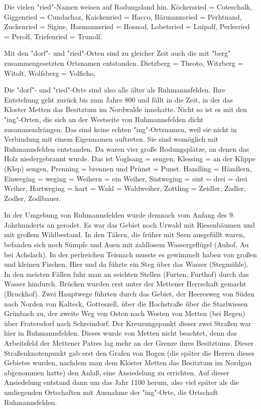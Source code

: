 \documentclass{book}
\begin{document}
Die vielen "ried"-Namen weisen auf Rodungsland hin. Köckersried = Coteschalk,
Giggenried = Cundachaz, Kaickenried = Hacco, Bärmannsried = Perhtnand,
Zuckenried = Sigine, Hasmannsried = Hosnod, Lobetsried = Luipolf, Perlesried =
Perolf, Triefenried = Trunolf.

Mit den "dorf"- und "ried"-Orten sind zu gleicher Zeit auch die mit "berg"
zusammengesetzten Ortsnamen entstanden. Dietzberg = Theoto, Witzberg = Witolt,
Wolfsberg = Volficho,

Die "dorf"- und "ried"-Orte sind also alle älter als Ruhmannsfelden. Ihre
Entstehung geht zurück bis zum Jahre 800 und fällt in die Zeit, in der das
Kloster Metten das Besitztum im Nordwalde innehatte. Nicht so ist es mit den
"ing"-Orten, die sich an der Westseite von Ruhmannsfelden dicht zusammendrängen.
Das sind keine echten "ing"-Ortsnamen, weil sie nicht in Verbindung mit einem
Eigennamen auftreten. Sie sind womöglich mit Ruhmannsfelden entstanden. Da waren
vier große Rodungsplätze, an denen das Holz niedergebrannt wurde. Das ist
Voglsang = sengen, Klessing = an der Klippe (Klep) sengen, Prenning = brennen
und Prünst = Punst. Handling = Händlern, Einweging = weging = Weihern = ein
Weiher, Sintweging = sint = drei = drei Weiher, Hartweging = hart = Wald =
Waldweiher, Zottling = Zeidler, Zadler, Zodler, Zodlbauer.

In der Umgebung von Ruhmannsfelden wurde demnach vom Anfang des 9. Jahrhunderts
an gerodet. Es war das Gebiet noch Urwald mit Riesenbäumen und mit großem
Wildbestand. In den Tälern, die früher mit Seen ausgefüllt waren, befanden sich
noch Sümpfe und Auen mit zahllosem Wassergeflügel (Auhof, Au bei Achslach). In
der perlreichen Teisnach musste es gewimmelt haben von großen und kleinen
Fischen. Hier und da führte ein Steg über das Wasser (Stegmühle). In den meisten
Fällen fuhr man an seichten Stellen (Furten, Furthof) durch das Wasser hindurch.
Brücken wurden erst unter der Mettener Herrschaft gemacht (Bruckhof). Zwei
Hauptwege führten durch das Gebiet, der Heeresweg von Süden nach Norden von
Kalteck, Gotteszell, über die Hochstraße über die Starlwiesen Grünbach zu, der
zweite Weg von Osten nach Westen von Metten (bei Regen) über Fratersdorf nach
Schreindorf. Der Kreuzungspunkt dieser zwei Straßen war hier in Ruhmannsfelden.
Dieses wurde von Metten nicht beachtet, denn das Arbeitsfeld der Mettener Patres
lag mehr an der Grenze ihres Besitztums. Dieser Straßenknotenpunkt gab erst den
Grafen von Bogen (die später die Herren dieses Gebietes wurden, nachdem man dem
Kloster Metten das Besitztum im Nordgau abgenommen hatte) den Anlaß, eine
Ansiedelung zu errichten. Auf dieser Ansiedelung entstand dann um das Jahr 1100
herum, also viel später als die umliegenden Ortschaften mit Ausnahme der
"ing"-Orte, die Ortschaft Ruhmannsfelden.
\end{document}
